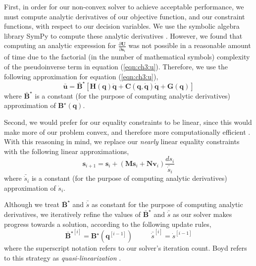 First, in order for our non-convex solver to achieve acceptable performance, we must compute analytic derivatives of our objective function, and our constraint functions, with respect to our decision variables.
We use the symbolic algebra library SymPy to compute these analytic derivatives \cite{sympy:2014}.
However, we found that computing an analytic expression for $\frac{ \partial \mathbf{U} }{ \partial \mathbf{s}_i } $ was not possible in a reasonable amount of time due to the factorial (in the number of mathematical symbols) complexity of the pseudoinverse term  in equation (\ref{eqn:ch3:u}).
Therefore, we use the following approximation for equation (\ref{eqn:ch3:u}),
%
\begin{equation}
\bar{\mathbf{u}} = \bar{\mathbf{B}}^{\star} \left[\mathbf{H}(\mathbf{q}) \ddot{\mathbf{q}} + \mathbf{C}(\mathbf{q},\dot{\mathbf{q}}) \dot{\mathbf{q}} + \mathbf{G}(\mathbf{q})\right]
\label{eqn:ch3:uhat}
\end{equation}
%
where $\bar{\mathbf{B}}^{\star}$ is a constant (for the purpose of computing analytic derivatives) approximation of $\mathbf{B}^{\star}(\mathbf{q})$.


Second, we would prefer for our equality constraints to be linear, since this would make more of our problem convex, and therefore more computationally efficient \cite{boyd:2008}.
With this reasoning in mind, we replace our \emph{nearly} linear equality constraints with the following linear approximations,
%
\begin{equation}
\mathbf{s}_{i+1} = \mathbf{s}_{i} + (\mathbf{M}\mathbf{s}_{i} + \mathbf{N}\mathbf{v}_{i}) \frac{ds_i}{\bar{\dot{s}}_i}
\end{equation}
%
where $\bar{\dot{s}}_i$ is a constant (for the purpose of computing analytic derivatives) approximation of $\dot{s}_i$.

Although we treat $\bar{\mathbf{B}}^{\star}$ and $\bar{\dot{s}}$ as constant for the purpose of computing analytic derivatives, we iteratively refine the values of $\bar{\mathbf{B}}^{\star}$ and $\bar{\dot{s}}$ as our solver makes progress towards a solution, according to the following update rules,
%
\begin{equation}
\bar{\mathbf{B}}^{\star [i]} = \mathbf{B}^{\star}(\mathbf{q}^{[i-1]}) ~~~~~~~~~~~~ \bar{\dot{s}}^{[i]} = \dot{s}^{[i-1]}
\end{equation}
%
where the superscript notation refers to our solver's iteration count.
Boyd refers to this strategy as \emph{quasi-linearization} .

